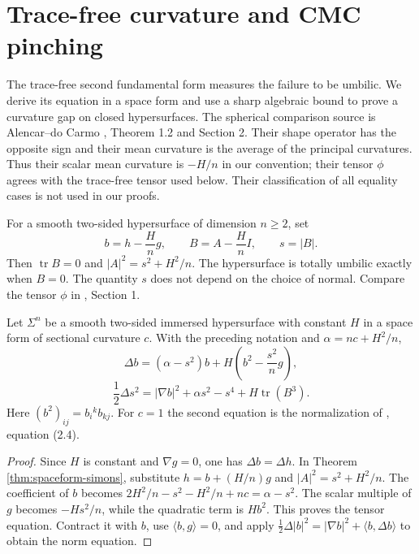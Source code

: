 \chapter{Trace-free curvature and CMC pinching}\label{sec:cmc-pinching}
The trace-free second fundamental form measures the failure to be umbilic. We derive its equation in a space form and use a sharp algebraic bound to prove a curvature gap on closed hypersurfaces. The spherical comparison source is Alencar--do Carmo \cite{AdC94}, Theorem 1.2 and Section 2. Their shape operator has the opposite sign and their mean curvature is the average of the principal curvatures. Thus their scalar mean curvature is $-H/n$ in our convention; their tensor $\phi$ agrees with the trace-free tensor used below. Their classification of all equality cases is not used in our proofs.

\begin{definition}\label{def:tracefree-second-form}
For a smooth two-sided hypersurface of dimension $n\geq2$, set
\[
 b=h-\frac Hn g,\qquad B=A-\frac Hn I,\qquad s=|B|.
\]
Then $\operatorname{tr}B=0$ and $|A|^2=s^2+H^2/n$. The hypersurface is totally umbilic exactly when $B=0$. The quantity $s$ does not depend on the choice of normal. Compare the tensor $\phi$ in \cite{AdC94}, Section 1.
\end{definition}

\begin{proposition}\label{prop:cmc-tracefree-simons}
Let $\Sigma^n$ be a smooth two-sided immersed hypersurface with constant $H$ in a space form of sectional curvature $c$. With the preceding notation and $\alpha=nc+H^2/n$,
\[
 \Delta b=(\alpha-s^2)b+H\left(b^2-\frac{s^2}{n}g\right),
\]
\[
 \frac12\Delta s^2=|\nabla b|^2+\alpha s^2-s^4+H\operatorname{tr}(B^3).
\]
Here $(b^2)_{ij}=b_i{}^kb_{kj}$. For $c=1$ the second equation is the normalization of \cite{AdC94}, equation (2.4).
\end{proposition}
\begin{proof}
Since $H$ is constant and $\nabla g=0$, one has $\Delta b=\Delta h$. In Theorem \ref{thm:spaceform-simons}, substitute $h=b+(H/n)g$ and $|A|^2=s^2+H^2/n$. The coefficient of $b$ becomes
$2H^2/n-s^2-H^2/n+nc=\alpha-s^2$. The scalar multiple of $g$ becomes $-Hs^2/n$, while the quadratic term is $Hb^2$. This proves the tensor equation. Contract it with $b$, use $\langle b,g\rangle=0$, and apply $\frac12\Delta|b|^2=|\nabla b|^2+\langle b,\Delta b\rangle$ to obtain the norm equation.
\end{proof}

